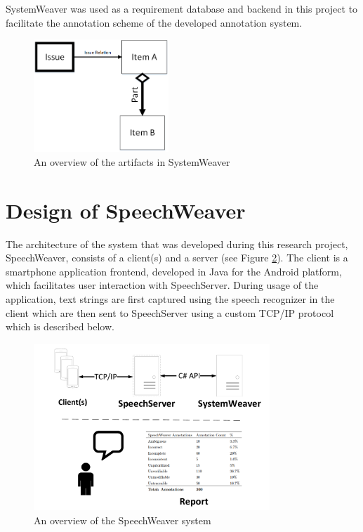 \documentclass[conference]{IEEEtran}
\begin{document}
SystemWeaver was used as a requirement database and backend in this project to facilitate the annotation scheme of the developed annotation system.

\begin{figure}[!t]
\centering
\includegraphics[width=2in]{pdf/blackwhiteipi.png}
\caption{An overview of the artifacts in SystemWeaver}
\label{fig:ipiov}
\end{figure}

\section{Design of SpeechWeaver}
\label{sec:design}
The architecture of the system that was developed during this research project, SpeechWeaver, consists of a client(s) and a server (see Figure \ref{fig:sysov}). 
The client is a smartphone application frontend, developed in Java for the Android platform, which facilitates user interaction with SpeechServer. 
During usage of the application, text strings are first captured using the speech recognizer in the client which are then sent to SpeechServer using a custom TCP/IP protocol which is described below.

\begin{figure}[!t]

\centering
\includegraphics[width=3.5in]{pdf/systemov.pdf}
\caption{An overview of the SpeechWeaver system}
\label{fig:sysov}
\end{figure}
\end{document}
